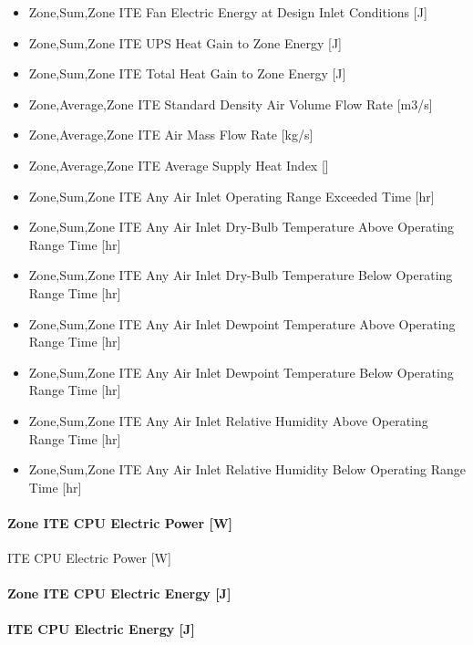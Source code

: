 \begin{itemize}
\item
  Zone,Sum,Zone ITE Fan Electric Energy at Design Inlet Conditions {[}J{]}
\item
  Zone,Sum,Zone ITE UPS Heat Gain to Zone Energy {[}J{]}
\item
  Zone,Sum,Zone ITE Total Heat Gain to Zone Energy {[}J{]}
\item
  Zone,Average,Zone ITE Standard Density Air Volume Flow Rate {[}m3/s{]}
\item
  Zone,Average,Zone ITE Air Mass Flow Rate {[}kg/s{]}
\item
  Zone,Average,Zone ITE Average Supply Heat Index {[]}
\item
  Zone,Sum,Zone ITE Any Air Inlet Operating Range Exceeded Time {[}hr{]}
\item
  Zone,Sum,Zone ITE Any Air Inlet Dry-Bulb Temperature Above Operating Range Time {[}hr{]}
\item
  Zone,Sum,Zone ITE Any Air Inlet Dry-Bulb Temperature Below Operating Range Time {[}hr{]}
\item
  Zone,Sum,Zone ITE Any Air Inlet Dewpoint Temperature Above Operating Range Time {[}hr{]}
\item
  Zone,Sum,Zone ITE Any Air Inlet Dewpoint Temperature Below Operating Range Time {[}hr{]}
\item
  Zone,Sum,Zone ITE Any Air Inlet Relative Humidity Above Operating Range Time {[}hr{]}
\item
  Zone,Sum,Zone ITE Any Air Inlet Relative Humidity Below Operating Range Time {[}hr{]}
\end{itemize}

\paragraph{Zone ITE CPU Electric Power {[}W{]}}\label{zone-ite-cpu-electric-power-w}

ITE CPU Electric Power {[}W{]}

\paragraph{Zone ITE CPU Electric Energy {[}J{]}}\label{zone-ite-cpu-electric-energy-j}

\paragraph{ITE CPU Electric Energy {[}J{]}}\label{ite-cpu-electric-energy-j}

